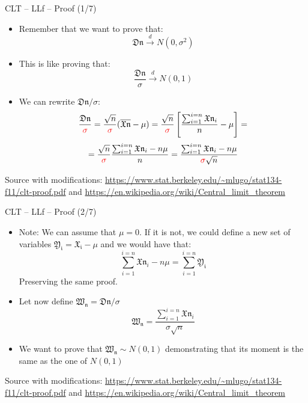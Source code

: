 \documentclass{beamer}
\begin{document}
\begin{frame}
{\centerline{CLT -- LLf -- Proof (1/7)}}


\begin{itemize}
\item Remember that we want to prove that:
$$\mathfrak{Dn} \xrightarrow{d} N(0,\sigma^2)$$
\item This is like proving that:
$$\frac{\mathfrak{Dn}}{\sigma} \xrightarrow{d} N(0,1)$$
\item We can rewrite $\mathfrak{Dn}/\sigma$:
$$\frac{\mathfrak{Dn}}{\textcolor{red}{\sigma}} = \frac{\sqrt{n}}{\textcolor{red}{\sigma}}(\overline{\mathfrak{Xn}}-\mu) = \frac{\sqrt{n}}{\textcolor{red}{\sigma}} \left [ \frac{\sum_{i=1}^{i=n}{\mathfrak{Xn}_i}}{n} - \mu \right ]
= $$
$$ = \frac{\sqrt{n}}{\textcolor{red}{\sigma}} \frac{\sum_{i=1}^{i=n}{\mathfrak{Xn}_i} -  n\mu}{n} 
= \frac{\sum_{i=1}^{i=n}{\mathfrak{Xn}_i} -  n\mu}{\textcolor{red}{\sigma}\sqrt{n}} $$

\end{itemize}

\begin{center}
\tiny 
Source with modifications: \url{https://www.stat.berkeley.edu/~mlugo/stat134-f11/clt-proof.pdf} and \url{https://en.wikipedia.org/wiki/Central_limit_theorem}
\end{center}
\end{frame}


\begin{frame}
{\centerline{CLT -- LLf -- Proof (2/7)}}


\begin{itemize}
\item Note: We can assume that $\mu=0$. If it is not, we could define a new set of variables $\mathfrak{Y_i} = \mathfrak{X_i} - \mu$ and we would have that:
$$\sum_{i=1}^{i=n}\mathfrak{Xn}_i -  n\mu = \sum_{i=1}^{i=n} \mathfrak{Y_i}$$
Preserving the same proof.
\item Let now define $\mathfrak{W_n} = \mathfrak{Dn}/\sigma$
$$\mathfrak{W_n}= \frac{\sum_{i=1}^{i=n}{\mathfrak{Xn}_i} }{\sigma\sqrt{n}} $$
\item We want to prove that $\mathfrak{W_n} \sim N(0,1)$ demonstrating that its moment is the same as the one of $N(0,1)$
\end{itemize}

\begin{center}
\tiny 
Source with modifications: \url{https://www.stat.berkeley.edu/~mlugo/stat134-f11/clt-proof.pdf} and \url{https://en.wikipedia.org/wiki/Central_limit_theorem}
\end{center}
\end{frame}
\end{document}
